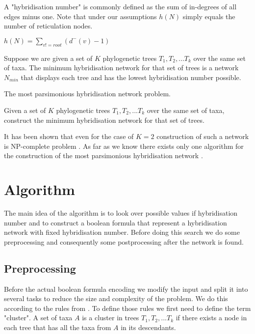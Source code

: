 \documentclass[runningheads, envcountsame, a4paper]{llncs}
\begin{document}
A "hybridisation number" is commonly defined as the sum of in-degrees of all edges minus one. Note that under our assumptions $h(N)$ simply equals the number of reticulation nodes.

$h(N) = \sum\limits_{v != root} (d^-(v) - 1)$

Suppose we are given a set of $K$ phylogenetic trees $T_1, T_2, ... T_k$ over the same set of taxa. The minimum hybridisation network for that set of trees is a network $N_{min}$ that displays each tree and has the lowest hybridisation number possible.

The most parsimonious hybridisation network problem.

Given a set of $K$ phylogenetic trees $T_1, T_2, ... T_k$ over the same set of taxa, construct the minimum hybridisation network for that set of trees.

It has been shown that even for the case of $K=2$ construction of such a network is NP-complete problem \cite {M. Bordewich and C. Semple. Computing the minimum number of hybridization events for a consistent evolutionary history.}. As far as we know there exists only one algorithm for the construction of the most parsimonious hybridisation network \cite {wu}.


\section{Algorithm}

The main idea of the algorithm is to look over possible values if hybridisation number and to construct a boolean formula that represent a hybridisation network with fixed hybridisation number. Before doing this search we do some preprocessing and consequently some postprocessing after the network is found.


\subsection{Preprocessing}

Before the actual boolean formula encoding we modify the input and split it into several tasks to reduce the size and complexity of the problem. We do this according to the rules from \cite {Efficiently Calculating Evolutionary Tree Measures Using SAT Maria Luisa Bonet1 and Katherine St. John2}. To define those rules we first need to define the term "cluster". A set of taxa $A$ is a cluster in trees $T_1, T_2, ... T_k$ if there exists a node in each tree that has all the taxa from $A$ in its descendants.
\end{document}
